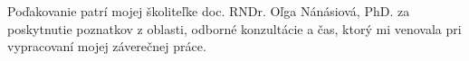 Poďakovanie patrí mojej školiteľke doc. RNDr. Oľga Nánásiová, PhD. za poskytnutie
poznatkov z oblasti, odborné konzultácie a čas, ktorý mi venovala pri vypracovaní
mojej záverečnej práce.